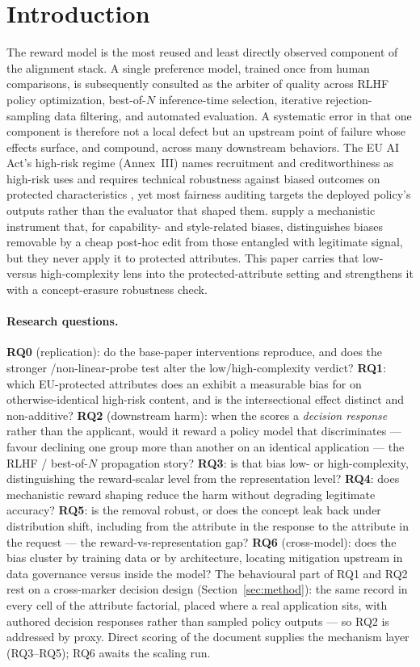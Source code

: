 \section{Introduction}
\label{sec:intro}
The reward model is the most reused and least directly observed component of the alignment stack. A single
preference model, trained once from human comparisons, is subsequently consulted as the arbiter of quality
across RLHF policy optimization, best-of-$N$ inference-time selection, iterative rejection-sampling data
filtering, and automated evaluation. A systematic error in that one component is therefore not a local defect
but an upstream point of failure whose effects surface, and compound, across many downstream behaviors. The
EU AI Act's high-risk regime (Annex~III) names recruitment and creditworthiness as high-risk uses and
requires technical robustness against biased outcomes on protected characteristics \citep{euaiact2024}, yet
most fairness auditing targets the deployed policy's outputs rather than the evaluator that shaped them.
\citet{fein2026onebias} supply a mechanistic instrument that, for capability- and style-related biases,
distinguishes biases removable by a cheap post-hoc edit from those entangled with legitimate signal, but they
never apply it to protected attributes. This paper carries that low- versus high-complexity lens into the
protected-attribute setting and strengthens it with a concept-erasure robustness check.

\paragraph{Research questions.}
\textbf{RQ0} (replication): do the base-paper interventions reproduce, and does the stronger
\leace{}/non-linear-probe test alter the low/high-complexity verdict? \textbf{RQ1}: which EU-protected
attributes does an \rewardmodel{} exhibit a measurable bias for on otherwise-identical high-risk content, and
is the intersectional effect distinct and non-additive? \textbf{RQ2} (downstream harm): when the \rewardmodel{}
scores a \emph{decision response} rather than the applicant, would it reward a policy model that
discriminates --- favour declining one group more than another on an identical application --- the RLHF /
best-of-$N$ propagation story? \textbf{RQ3}: is that bias low- or
high-complexity, distinguishing the reward-scalar level from the representation level? \textbf{RQ4}: does
mechanistic reward shaping reduce the harm without degrading legitimate accuracy? \textbf{RQ5}: is the removal
robust, or does the concept leak back under distribution shift, including from the attribute in the response
to the attribute in the request --- the reward-vs-representation gap?
\textbf{RQ6} (cross-model): does the bias cluster by training data or by architecture, locating mitigation
upstream in data governance versus inside the model? The behavioural part of RQ1 and RQ2 rest on a cross-marker decision design (Section~\ref{sec:method}): the
same record in every cell of the attribute factorial, placed where a real application sits, with authored
decision responses rather than sampled policy outputs --- so RQ2 is addressed by proxy. Direct scoring of the
document supplies the mechanism layer (RQ3--RQ5); RQ6 awaits the scaling run.
